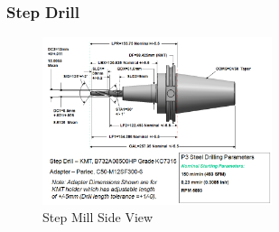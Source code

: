 \documentclass{mtconnect}	%
\begin{document}
\pagebreak

\subsubsection{Step Drill}

\begin{figure}[ht]
  \centering
  \includegraphics[width=0.6\textwidth]{figures/a9-step-drill-side-view.png}
  \caption{Step Mill Side View}
  \label{fig:a9-step-drill-side-view}
\end{figure}
\FloatBarrier
\end{document}

